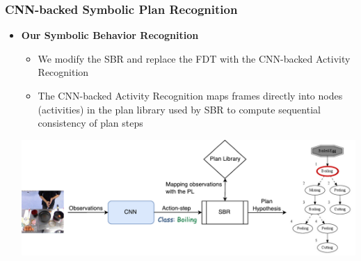 \documentclass[usenames,dvipsnames]{beamer}
\begin{document}
\begin{frame}[c]\frametitle{CNN-backed Symbolic Plan Recognition}
   	\begin{itemize}
   		\item \textbf{Our Symbolic Behavior Recognition}
   		\begin{itemize}
				\item We modify the SBR and replace the FDT with the CNN-backed Activity Recognition
                \item The CNN-backed Activity Recognition maps frames directly into nodes (activities) in the plan library used by SBR to compute sequential consistency of plan steps
	    \end{itemize}
		\begin{center}
			\includegraphics[width=0.9\linewidth]{fig/sbr.pdf}
		\end{center}
	\end{itemize}
\end{frame}
\fi
\end{document}

